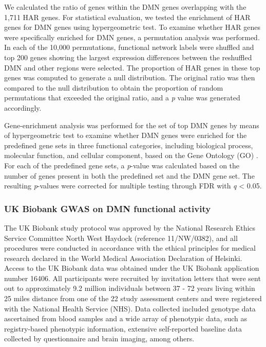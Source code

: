 \begin{refsection}
We calculated the ratio of genes within the DMN genes overlapping with the 1,711 HAR genes. For statistical evaluation, we tested the enrichment of HAR genes for DMN genes using hypergeometric test. To examine whether HAR genes were specifically enriched for DMN genes, a permutation analysis was performed. In each of the 10,000 permutations, functional network labels were shuffled and top 200 genes showing the largest expression differences between the reshuffled DMN and other regions were selected. The proportion of HAR genes in these top genes was computed to generate a null distribution. The original ratio was then compared to the null distribution to obtain the proportion of random permutations that exceeded the original ratio, and a \textit{p} value was generated accordingly.

Gene-enrichment analysis was performed for the set of top DMN genes by means of hypergeometric test to examine whether DMN genes were enriched for the predefined gene sets in three functional categories, including biological process, molecular function, and cellular component, based on the Gene Ontology (GO) \citep{Ashburner2000GeneOT}. For each of the predefined gene sets, a \textit{p}-value was calculated based on the number of genes present in both the predefined set and the DMN gene set. The resulting \textit{p}-values were corrected for multiple testing through FDR with \textit{q} < 0.05. 

\subsubsection*{UK Biobank GWAS on DMN functional activity}
The UK Biobank study protocol was approved by the National Research Ethics Service Committee North West Haydock (reference 11/NW/0382), and all procedures were conducted in accordance with the ethical principles for medical research declared in the World Medical Association Declaration of Helsinki. Access to the UK Biobank data was obtained under the UK Biobank application number 16406. All participants were recruited by invitation letters that were sent out to approximately 9.2 million individuals between 37 - 72 years living within 25 miles distance from one of the 22 study assessment centers and were registered with the National Health Service (NHS). Data collected included genotype data ascertained from blood samples and a wide array of phenotypic data, such as registry-based phenotypic information, extensive self-reported baseline data collected by questionnaire and brain imaging, among others.\\


\end{refsection}
